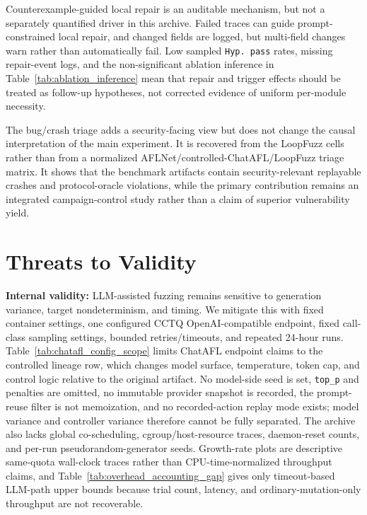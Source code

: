 \documentclass[final,5p,times,number]{elsarticle}
\begin{document}
Counterexample-guided local repair is an auditable mechanism, but not a separately quantified driver in this archive. Failed traces can guide prompt-constrained local repair, and changed fields are logged, but multi-field changes warn rather than automatically fail. Low sampled \texttt{Hyp. pass} rates, missing repair-event logs, and the non-significant ablation inference in Table~\ref{tab:ablation_inference} mean that repair and trigger effects should be treated as follow-up hypotheses, not corrected evidence of uniform per-module necessity.

The bug/crash triage adds a security-facing view but does not change the causal interpretation of the main experiment. It is recovered from the LoopFuzz cells rather than from a normalized AFLNet/controlled-ChatAFL/LoopFuzz triage matrix. It shows that the benchmark artifacts contain security-relevant replayable crashes and protocol-oracle violations, while the primary contribution remains an integrated campaign-control study rather than a claim of superior vulnerability yield.

\section{Threats to Validity}
\label{sec:threats}

\textbf{Internal validity:} LLM-assisted fuzzing remains sensitive to generation variance, target nondeterminism, and timing. We mitigate this with fixed container settings, one configured CCTQ OpenAI-compatible endpoint, fixed call-class sampling settings, bounded retries/timeouts, and repeated 24-hour runs. Table~\ref{tab:chatafl_config_scope} limits ChatAFL endpoint claims to the controlled lineage row, which changes model surface, temperature, token cap, and control logic relative to the original artifact. No model-side seed is set, \texttt{top\_p} and penalties are omitted, no immutable provider snapshot is recorded, the prompt-reuse filter is not memoization, and no recorded-action replay mode exists; model variance and controller variance therefore cannot be fully separated. The archive also lacks global co-scheduling, cgroup/host-resource traces, daemon-reset counts, and per-run pseudorandom-generator seeds. Growth-rate plots are descriptive same-quota wall-clock traces rather than CPU-time-normalized throughput claims, and Table~\ref{tab:overhead_accounting_gap} gives only timeout-based LLM-path upper bounds because trial count, latency, and ordinary-mutation-only throughput are not recoverable.
\end{document}
